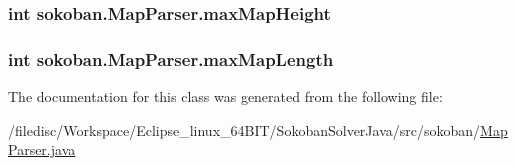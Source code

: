 \hypertarget{classsokoban_1_1MapParser_7b921505a8a815b72d89111ad8f49f14}{
\subsubsection[{maxMapHeight}]{\setlength{\rightskip}{0pt plus 5cm}int {\bf sokoban.MapParser.maxMapHeight}}}
\label{classsokoban_1_1MapParser_7b921505a8a815b72d89111ad8f49f14}


\hypertarget{classsokoban_1_1MapParser_a7a1cc46a740b1af8a71ccbad5b96764}{
\subsubsection[{maxMapLength}]{\setlength{\rightskip}{0pt plus 5cm}int {\bf sokoban.MapParser.maxMapLength}}}
\label{classsokoban_1_1MapParser_a7a1cc46a740b1af8a71ccbad5b96764}




The documentation for this class was generated from the following file:\begin{CompactItemize}
\item 
/filedisc/Workspace/Eclipse\_\-linux\_\-64BIT/SokobanSolverJava/src/sokoban/\hyperlink{MapParser_8java}{MapParser.java}\end{CompactItemize}
